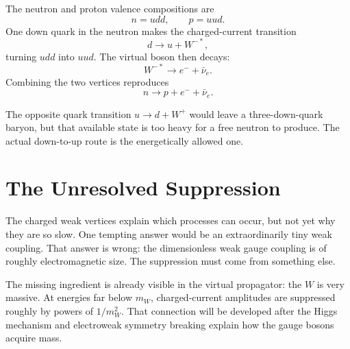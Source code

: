 The neutron and proton valence compositions are
\begin{equation}
n=udd,
\qquad
p=uud.
\end{equation}
One down quark in the neutron makes the charged-current transition
\begin{equation}
d\longrightarrow u+W^{-*},
\end{equation}
turning \(udd\) into \(uud\). The virtual boson then decays:
\begin{equation}
W^{-*}\longrightarrow e^-+\bar\nu_e.
\end{equation}
Combining the two vertices reproduces
\begin{equation}
n\longrightarrow p+e^-+\bar\nu_e.
\end{equation}

The opposite quark transition \(u\to d+W^+\) would leave a three-down-quark
baryon, but that available state is too heavy for a free neutron to produce.
The actual down-to-up route is the energetically allowed one.

\begin{classroomqa}
\end{classroomqa}

\section{The Unresolved Suppression}

The charged weak vertices explain which processes can occur, but not yet why
they are so slow. One tempting answer would be an extraordinarily tiny weak
coupling. That answer is wrong: the dimensionless weak gauge coupling is of
roughly electromagnetic size. The suppression must come from something else.

The missing ingredient is already visible in the virtual propagator: the
\(W\) is very massive. At energies far below \(m_W\), charged-current
amplitudes are suppressed roughly by powers of \(1/m_W^2\). That connection
will be developed after the Higgs mechanism and electroweak symmetry breaking
explain how the gauge bosons acquire mass.

